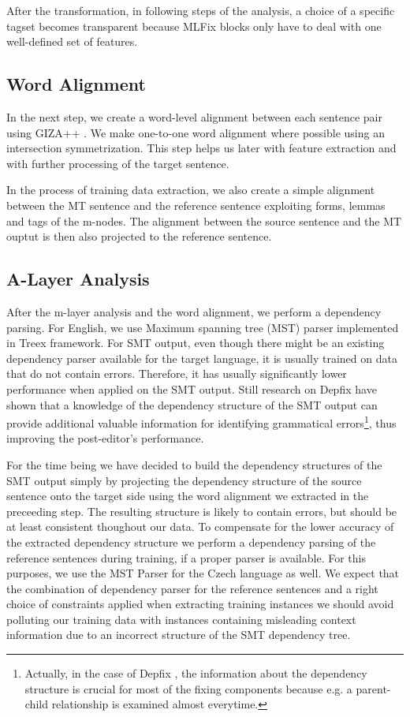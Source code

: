 After the transformation, in following steps of the analysis, a choice
of a specific tagset becomes transparent because MLFix blocks only
have to deal with one well-defined set of features.

\subsection{Word Alignment}

In the next step, we create a word-level alignment between each sentence pair
using GIZA++ \citep{och:ney:2000}. We make one-to-one word alignment where possible
using an intersection symmetrization. This step helps us later with feature extraction
and with further processing of the target sentence.

In the process of training data extraction, we also create a simple alignment between
the MT sentence and the reference sentence exploiting forms, lemmas and tags
of the m-nodes. The alignment between the source sentence and the MT ouptut is then also
projected to the reference sentence.

\subsection{A-Layer Analysis}

After the m-layer analysis and the word alignment, we perform a dependency parsing.
For English, we use Maximum spanning tree (MST) parser \citep{mcdonald:pereira:ribarov:hajic:2005}
implemented in Treex framework. For SMT output, even though there might
be an existing dependency parser available for the target language, it is usually
trained on data that do not contain errors. Therefore, it has usually significantly
lower performance when applied on the SMT output. Still research on Depfix have shown
that a knowledge of the dependency structure of the SMT output can provide additional
valuable information for identifying grammatical errors\footnote{Actually, in the case of Depfix
, the information about the dependency structure is crucial for most of the fixing components
because e.g. a parent-child relationship is examined almost everytime.}, thus improving
the post-editor's performance.

For the time being we have decided to build the dependency structures of the SMT output simply
by projecting the dependency structure of the source sentence onto the target side
using the word alignment we extracted in the preceeding step. The resulting structure
is likely to contain errors, but should be at least consistent thoughout our data.
To compensate for the lower accuracy of the extracted dependency structure we perform
a dependency parsing of the reference sentences during training, if a proper parser
is available. For this purposes, we use the MST Parser for the Czech language as well.
We expect that the combination of dependency parser for the reference sentences and
a right choice of constraints applied when extracting training instances we should
avoid polluting our training data with instances containing misleading context information
due to an incorrect structure of the SMT dependency tree.

